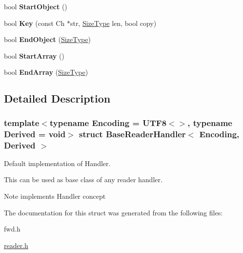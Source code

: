 \begin{DoxyCompactItemize}
\item 
\mbox{\label{a02216_ab0a7d9bcececb8d6ed748656f67f4917}} 
bool {\bfseries Start\+Object} ()
\item 
\mbox{\label{a02216_abc50b2e7e411b7b731715e05cd01e2eb}} 
bool {\bfseries Key} (const Ch $\ast$str, \hyperlink{a00560_a5ed6e6e67250fadbd041127e6386dcb5}{Size\+Type} len, bool copy)
\item 
\mbox{\label{a02216_a0406cee0af26bc3a0b7fb2414537b0ab}} 
bool {\bfseries End\+Object} (\hyperlink{a00560_a5ed6e6e67250fadbd041127e6386dcb5}{Size\+Type})
\item 
\mbox{\label{a02216_a9dbb1143a250a904bb18a174553a3a00}} 
bool {\bfseries Start\+Array} ()
\item 
\mbox{\label{a02216_ae9d60a8779b6a77a7f283d64961879fb}} 
bool {\bfseries End\+Array} (\hyperlink{a00560_a5ed6e6e67250fadbd041127e6386dcb5}{Size\+Type})
\end{DoxyCompactItemize}


\subsection{Detailed Description}
\subsubsection*{template$<$typename Encoding = U\+T\+F8$<$$>$, typename Derived = void$>$\newline
struct Base\+Reader\+Handler$<$ Encoding, Derived $>$}

Default implementation of Handler. 

This can be used as base class of any reader handler. \begin{DoxyNote}{Note}
implements Handler concept 
\end{DoxyNote}


The documentation for this struct was generated from the following files\+:\begin{DoxyCompactItemize}
\item 
fwd.\+h\item 
\hyperlink{a00563}{reader.\+h}\end{DoxyCompactItemize}
